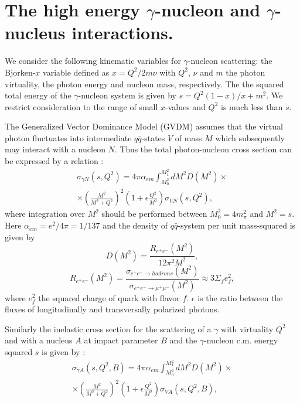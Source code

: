 \section{The high energy $\gamma$-nucleon and $\gamma$-nucleus
 interactions.}
 
\hspace{1.0em}We consider the following kinematic 
variables for $\gamma$-nucleon
scattering: the Bjorken-$x$ variable defined as $x=Q^2/2m\nu$ with $Q^2$, $\nu$
and $m$ the photon virtuality, the photon energy and nucleon mass,
respectively.
The the squared total energy of the $\gamma$-nucleon system is given by
$s=Q^2(1-x)/x + m^2$. We restrict consideration to
 the range of small $x$-values and  $Q^2$ is much
less than $s$.

The Generalized Vector Dominance Model (GVDM) \cite{BSY78}
 assumes that the virtual photon 
fluctuates into intermediate $q\bar{q}$-states $V$ of mass $M$ which
 subsequently may 
interact with a nucleon $N$. 
Thus the total photon-nucleon cross section
 can be expressed by a relation \cite{PRW95}:
\begin{equation}
\begin{array}{c}
\label{HEGI1}\sigma_{\gamma N}(s,Q^2)=4\pi\alpha_{em}\int_{M^2_0}^{M^2_{1}}
dM^2D(M^2)\times \\
\times (\frac{M^2}{M^2+Q^2})^2(1+\epsilon\frac{Q^2}{M^2})\sigma_{VN}(s,Q^2),
\end{array}
\end{equation}
where integration over $M^2$ should be performed between $M^2_0=4m^2_{\pi}$
 and $M^2=s$.
Here $\alpha_{em} = e^2/4\pi = 1/137$ and the density
 of $q\bar{q}$-system per
unit mass-squared is given by
\begin{equation}
\label{HEGI2}D(M^2)= \frac{R_{e^{+}e^{-}}(M^2)}{12\pi^2M^2},
\end{equation}
\begin{equation}
\label{HEGI3} R_{e^{+}e^{-}}(M^2)=\frac{\sigma_{e^{+}e^{-}\rightarrow
hadrons}(M^2)}{\sigma_{e^{+}e^{-}\rightarrow
\mu^{+}\mu^{-}}(M^2)}\approx 3\Sigma_{f}e^2_{f},
\end{equation}
where $e^2_{f}$ the squared charge of quark with flavor $f$. 
$\epsilon$ is the
ratio between the fluxes of longitudinally
 and transversally polarized photons.

Similarly the
 inelastic cross section for the scattering of a $\gamma$ with virtuality
$Q^2$ and with  a nucleus $A$ at impact parameter $B$ 
and the $\gamma$-nucleon c.m.
energy squared $s$ is given by \cite{ERR97}:
\begin{equation}
\begin{array}{c}
\label{HEGI4}\sigma_{\gamma A}(s,Q^2,B)=4\pi\alpha_{em}\int_{M^2_0}^{M^2_{1}}
dM^2D(M^2)\times \\
\times (\frac{M^2}{M^2+Q^2})^2(1+\epsilon\frac{Q^2}{M^2})\sigma_{VA}(s,Q^2,B),
\end{array}
\end{equation}

